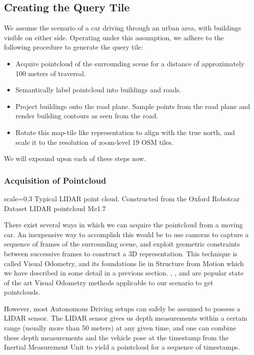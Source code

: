 \subsection{Creating the Query Tile}
We assume the scenario of a car driving through an urban area, with buildings visible on either side. Operating under this assumption, we adhere to the following procedure to generate the query tile:

\begin{itemize}
	\item Acquire pointcloud of the surrounding scene for a distance of approximately 100 meters of traversal.\\
	\item Semantically label pointcloud into buildings and roads.\\
	\item Project buildings onto the road plane. Sample points from the road plane and render building contours as seen from the road. \\
	\item Rotate this map-tile like representation to align with the true north, and scale it to the resolution of zoom-level 19 OSM tiles.
\end{itemize}

We will expound upon each of these steps now.

\subsubsection{Acquisition of Pointcloud}

{scale=0.3}%
{Typical LIDAR point cloud. Constructed from the Oxford Robotcar Dataset}%
{LIDAR pointcloud}%
{Me1.7}

There exist several ways in which we can acquire the pointcloud from a moving car. An inexpensive way to accomplish this would be to use cameras to capture a sequence of frames of the surrounding scene, and exploit geometric constraints between successive frames to construct a 3D representation. This technique is called Visual Odometry, and its foundations lie in Structure from Motion which we have described in some detail in a previous section. \cite{Mur-Artal2018}, \cite{Schops2019}, and \cite{Das2018} are popular state of the art Visual Odometry methods applicable to our scenario to get pointclouds.

However, most Autonomous Driving setups can safely be assumed to possess a LIDAR sensor. The LIDAR sensor gives us depth measurements within a certain range (usually more than 50 meters) at any given time, and one can combine these depth measurements and the vehicle pose at the timestamp from the Inertial Measurement Unit to yield a pointcloud for a sequence of timestamps. 


